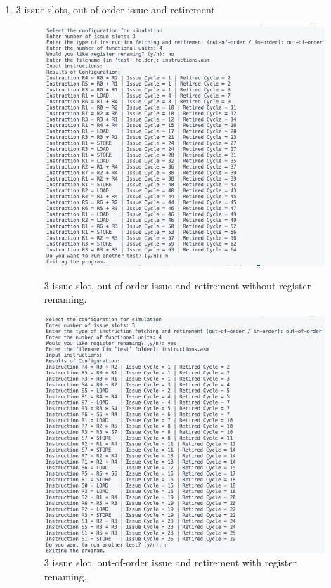 \documentclass{article}
\begin{document}
\begin{enumerate}
    \item 3 issue slots, out-of-order issue and retirement 
    \begin{figure}[H]
        \centering 
        \begin{minipage}[t]{0.45\textwidth}
            \centering
            \includegraphics[width=\textwidth]{Images/Config6.png}
            \caption{3 issue slot, out-of-order issue and retirement without register renaming.}
        \end{minipage}
        \hfill
        \begin{minipage}[t]{0.45\textwidth}
            \centering 
            \includegraphics[width=\textwidth]{Images/Config6_Renaming.png}
            \caption{3 issue slot, out-of-order issue and retirement with register renaming.}
        \end{minipage}
    \end{figure}
\end{enumerate}
\end{document}
